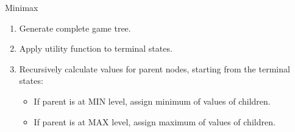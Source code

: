\documentclass[english]{panikzettel}
\begin{document}
\begin{algo}{Minimax}
\begin{enumerate}
    \item Generate complete game tree.
    \item Apply utility function to terminal states.
    \item Recursively calculate values for parent nodes, starting from the terminal states:
        \begin{itemize}
            \item If parent is at MIN level, assign minimum of values of children.
            \item If parent is at MAX level, assign maximum of values of children.
        \end{itemize}
\end{enumerate}
\end{algo}
\end{document}
